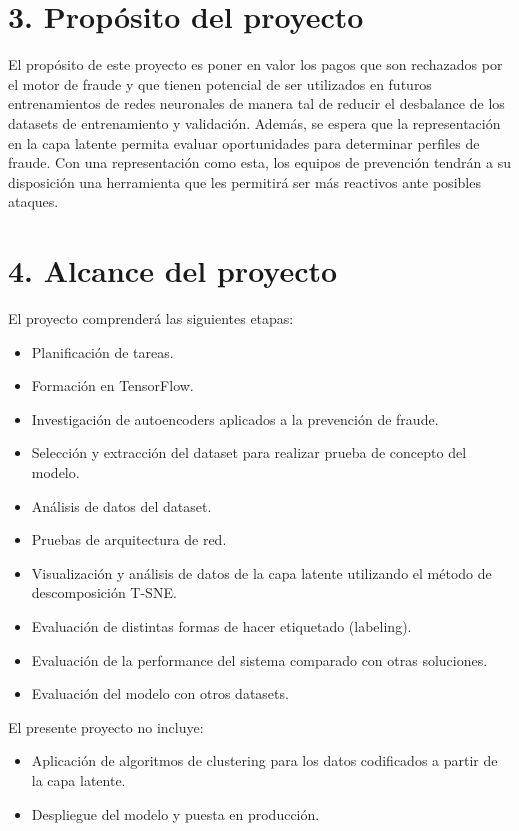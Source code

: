 \documentclass[
11pt, %
]{charter}
\begin{document}
\section{3. Propósito del proyecto}
\label{sec:proposito}
El propósito de este proyecto es poner en valor los pagos que son rechazados por el motor de fraude y que tienen potencial de ser utilizados en futuros entrenamientos de redes neuronales de manera tal de reducir el desbalance de los datasets de entrenamiento y validación. Además, se espera que la representación en la capa latente permita evaluar oportunidades para determinar perfiles de fraude. Con una representación como esta, los equipos de prevención tendrán a su disposición una herramienta que les permitirá ser más reactivos ante posibles ataques. 

\section{4. Alcance del proyecto}
\label{sec:alcance}
El proyecto comprenderá las siguientes etapas:
\begin{itemize}
\item Planificación de tareas.
\item Formación en TensorFlow.
\item Investigación de autoencoders aplicados a la prevención de fraude.
\item Selección y extracción del dataset para realizar prueba de concepto del modelo.
\item Análisis de datos del dataset.
\item Pruebas de arquitectura de red.
\item Visualización y análisis de datos de la capa latente utilizando el método de descomposición T-SNE.
\item Evaluación de distintas formas de hacer etiquetado (labeling).
\item Evaluación de la performance del sistema comparado con otras soluciones.
\item Evaluación del modelo con otros datasets.
\end{itemize}


El presente proyecto no incluye:
\begin{itemize}
\item Aplicación de algoritmos de clustering para los datos codificados a partir de la capa latente.
\item Despliegue del modelo y puesta en producción.
\end{itemize}
\end{document}
